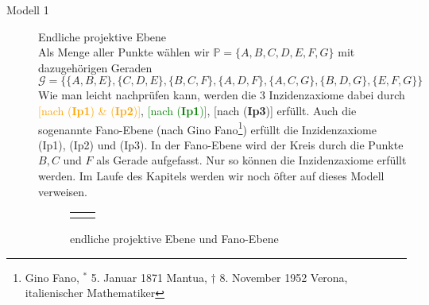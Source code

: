   \begin{description}
      \item[Modell 1] Endliche projektive Ebene \\
          Als Menge aller Punkte wählen wir $\mathbb{P} = \lbrace A,B,C,D,E,F,G \}$ mit dazugehörigen Geraden\\
          $\mathcal{G} = \big \{ \{ A,B,E \}, \{ C,D,E \}, \{ B,C,F \}, \{ A,D,F \},\{ A,C,G \}, \{ B,D,G \}, \{ E,F,G \} \big\}$ \\
          Wie man leicht nachprüfen kann, werden die $3$ Inzidenzaxiome dabei durch
          \textcolor{orange}{[nach (\textbf{Ip1}) \& (\textbf{Ip2})]},
          \textcolor{green}{[nach (\textbf{Ip1})]}, [nach (\textbf{Ip3})] erfüllt.
          Auch die sogenannte Fano-Ebene (nach Gino Fano\footnote{Gino Fano,
          $^*$ 5. Januar 1871 Mantua, $\dag$ 8. November 1952 Verona, italienischer Mathematiker})
          erfüllt die Inzidenzaxiome (Ip1), (Ip2) und (Ip3). In der Fano-Ebene wird der Kreis
          durch die Punkte $B,C$ und $F$ als Gerade aufgefasst. Nur so können die Inzidenzaxiome
          erfüllt werden. Im Laufe des Kapitels werden wir noch öfter auf dieses Modell verweisen.

          \begin{figure}[ht]
            \begin{tabular}{cc}
              
              &
              
            \end{tabular}
            \caption{endliche projektive Ebene und Fano-Ebene}
          \end{figure}


\end{description}
